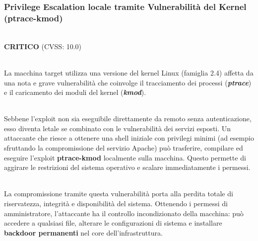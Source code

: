 \documentclass[12pt, a4paper]{article}
\begin{document}

    \newpage
    \subsubsection{Privilege Escalation locale tramite Vulnerabilità del Kernel (ptrace-kmod)}
    \\ \vspace{0.15cm}
    {\color{red} \textbf{CRITICO}} (CVSS: 10.0)

    \vspace{0.5cm}
    \\ \vspace{0.15cm}
    La macchina target utilizza una versione del kernel Linux (famiglia 2.4) affetta da una nota e grave vulnerabilità che coinvolge il tracciamento dei processi (\textit{\textbf{ptrace}}) e il caricamento dei moduli del kernel (\textit{\textbf{kmod}}). 

    \vspace{0.5cm}
    \\ \vspace{0.15cm}
    Sebbene l'exploit non sia eseguibile direttamente da remoto senza autenticazione, esso diventa letale se combinato con le vulnerabilità dei servizi esposti. Un attaccante che riesce a ottenere una shell iniziale con privilegi minimi (ad esempio sfruttando la compromissione del servizio Apache) può trasferire, compilare ed eseguire l'exploit \textbf{ptrace-kmod} localmente sulla macchina. Questo permette di aggirare le restrizioni del sistema operativo e scalare immediatamente i permessi.

    \vspace{0.5cm}
    \\ \vspace{0.15cm}
    La compromissione tramite questa vulnerabilità porta alla perdita totale di riservatezza, integrità e disponibilità del sistema. Ottenendo i permessi di amministratore, l'attaccante ha il controllo incondizionato della macchina: può accedere a qualsiasi file, alterare le configurazioni di sistema e installare \textbf{backdoor permanenti} nel core dell'infrastruttura.
\end{document}
